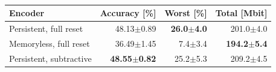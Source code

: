 \begin{table}[t]
\centering
\caption{}
\label{tab:operator-ablation}
\scriptsize
\setlength{\tabcolsep}{3.5pt}
\begin{tabular}{@{}lrrr@{}}
\toprule
Encoder & Accuracy [\%] & Worst [\%] & Total [Mbit] \\
\midrule
Persistent, full reset & 48.13$\pm$0.89 & \textbf{26.0$\pm$4.0} & 201.0$\pm$4.0 \\
Memoryless, full reset & 36.49$\pm$1.45 & 7.4$\pm$3.4 & \textbf{194.2$\pm$5.4} \\
Persistent, subtractive & \textbf{48.55$\pm$0.82} & 25.2$\pm$5.3 & 209.2$\pm$4.5 \\
\bottomrule
\end{tabular}
\end{table}
